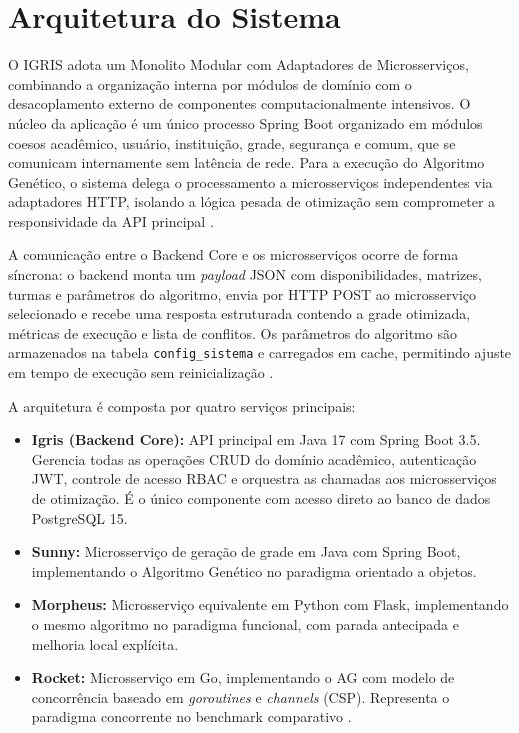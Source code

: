 \section{Arquitetura do Sistema}
\label{sec:4.1}

O IGRIS adota um Monolito Modular com Adaptadores de Microsserviços, combinando a organização interna por módulos de domínio com o desacoplamento externo de componentes computacionalmente intensivos. O núcleo da aplicação é um único processo Spring Boot organizado em módulos coesos acadêmico, usuário, instituição, grade, segurança e comum, que se comunicam internamente sem latência de rede. Para a execução do Algoritmo Genético, o sistema delega o processamento a microsserviços independentes via adaptadores HTTP, isolando a lógica pesada de otimização sem comprometer a responsividade da API principal \cite[p.~15--16]{newman2021}.

A comunicação entre o Backend Core e os microsserviços ocorre de forma síncrona: o backend monta um \textit{payload} JSON com disponibilidades, matrizes, turmas e parâmetros do algoritmo, envia por HTTP POST ao microsserviço selecionado e recebe uma resposta estruturada contendo a grade otimizada, métricas de execução e lista de conflitos. Os parâmetros do algoritmo são armazenados na tabela \texttt{config\_sistema} e carregados em cache, permitindo ajuste em tempo de execução sem reinicialização \cite[p.~3]{newman2021}.

A arquitetura é composta por quatro serviços principais:

\begin{itemize}
  \item \textbf{Igris (Backend Core):} API principal em Java 17 com Spring Boot 3.5. Gerencia todas as operações CRUD do domínio acadêmico, autenticação JWT, controle de acesso RBAC e orquestra as chamadas aos microsserviços de otimização. É o único componente com acesso direto ao banco de dados PostgreSQL 15.
  \item \textbf{Sunny:} Microsserviço de geração de grade em Java com Spring Boot, implementando o Algoritmo Genético no paradigma orientado a objetos.
  \item \textbf{Morpheus:} Microsserviço equivalente em Python com Flask, implementando o mesmo algoritmo no paradigma funcional, com parada antecipada e melhoria local explícita.
  \item \textbf{Rocket:} Microsserviço em Go, implementando o AG com modelo de concorrência baseado em \textit{goroutines} e \textit{channels} (CSP). Representa o paradigma concorrente no benchmark comparativo \cite{coxbuday2017}.
\end{itemize}

